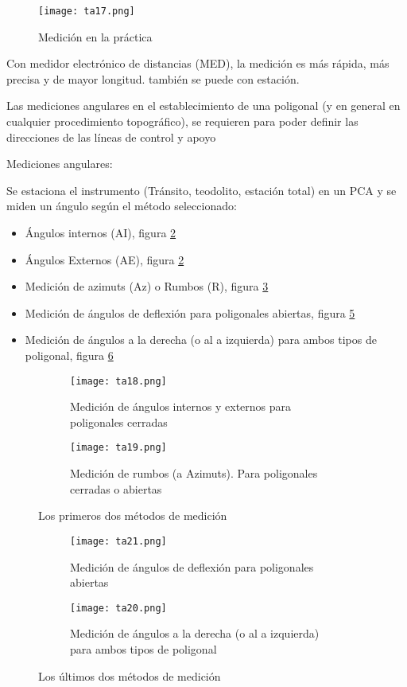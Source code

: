 \begin{figure}[h!]
  \centerline{\texttt{[image: ta17.png]}}
  \caption{Medición en la práctica}
  \label{ta17}
\end{figure}

Con medidor electrónico de distancias (MED), la medición es más rápida, más precisa y de mayor longitud. también se puede con estación.

Las mediciones angulares en el establecimiento de una poligonal (y en general en cualquier procedimiento topográfico), se requieren para poder definir las direcciones de las líneas de control y apoyo

Mediciones angulares:

Se estaciona el instrumento (Tránsito, teodolito, estación total) en un PCA y se miden un ángulo según el método seleccionado: 

\begin{itemize}
    \item Ángulos internos (AI), figura \ref{ta18}
    \item Ángulos Externos (AE), figura \ref{ta18}
    \item Medición de azimuts (Az) o Rumbos (R), figura \ref{ta19}
    \item Medición  de ángulos de deflexión para poligonales abiertas, figura \ref{ta20}
    \item Medición de ángulos a la derecha (o al a izquierda) para ambos tipos de poligonal, figura \ref{ta21}
\end{itemize}



\begin{figure}[h!]
    \centering
    \begin{subfigure}[b]{0.45\linewidth}
    \texttt{[image: ta18.png]}
    \caption{Medición de ángulos internos y externos para poligonales cerradas}
    \label{ta18}
    \end{subfigure}
    \begin{subfigure}[b]{0.45\linewidth}
    \texttt{[image: ta19.png]}
    \caption{Medición de rumbos (a Azimuts). Para poligonales cerradas o abiertas}
    \label{ta19}
    \end{subfigure}
    \caption{Los primeros dos métodos de medición}
    \label{ta18-19}
\end{figure}

    \begin{figure}[h!]
        \centering
        \begin{subfigure}[b]{0.45\linewidth}
        \texttt{[image: ta21.png]}
        \caption{Medición  de ángulos de deflexión para poligonales abiertas}
        \label{ta20}
        \end{subfigure}
        \begin{subfigure}[b]{0.45\linewidth}
        \texttt{[image: ta20.png]}
        \caption{Medición de ángulos a la derecha (o al a izquierda) para ambos tipos de poligonal}
        \label{ta21}
        \end{subfigure}
        \caption{Los últimos dos métodos de medición}
        \label{ta20-21}
        \end{figure}



